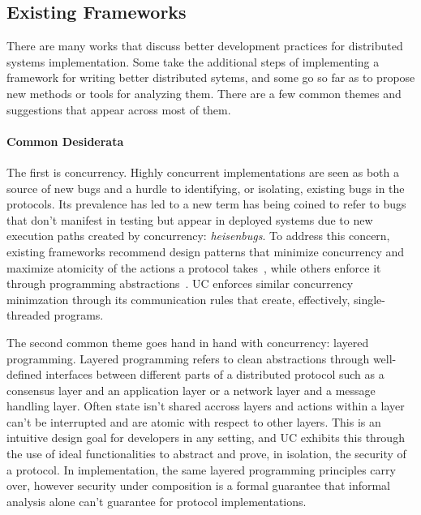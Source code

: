\subsection{Existing Frameworks}
There are many works that discuss better development practices for distributed systems implementation. 
Some take the additional steps of implementing a framework for writing better distributed sytems, and some go so far as to propose new methods or tools for analyzing them.
There are a few common themes and suggestions that appear across most of them.

\paragraph{Common Desiderata}
The first is concurrency.
Highly concurrent implementations are seen as both a source of new bugs and a hurdle to identifying, or isolating, existing bugs in the protocols.
Its prevalence has led to a new term has being coined to refer to bugs that don't manifest in testing but appear in deployed systems due to new execution paths created by concurrency: \emph{heisenbugs}.
To address this concern, existing frameworks recommend design patterns that minimize concurrency and maximize atomicity of the actions a protocol takes~\cite{farsite}, while others enforce it through programming abstractions~\cite{mace,verdi}.
UC enforces similar concurrency minimzation through its communication rules that create, effectively, single-threaded programs.

The second common theme goes hand in hand with concurrency: layered programming.
Layered programming refers to clean abstractions through well-defined interfaces between different parts of a distributed protocol such as a consensus layer and an application layer or a network layer and a message handling layer.
Often state isn't shared accross layers and actions within a layer can't be interrupted and are atomic with respect to other layers.
This is an intuitive design goal for developers in any setting, and UC exhibits this through the use of ideal functionalities to abstract and prove, in isolation, the security of a protocol.
In implementation, the same layered programming principles carry over, however security under composition is a formal guarantee that informal analysis alone can't guarantee for protocol implementations.

